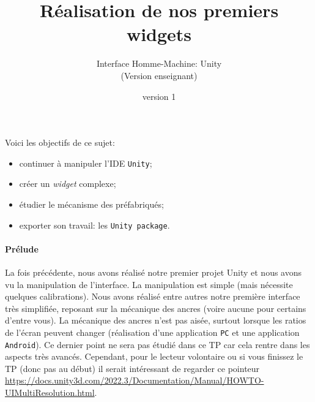 \documentclass[a4paper,10pt]{article}
\newenvironment{attention}%
{\begin{tcolorbox}[breakable,colback=green!25!white,colframe=red!55!black,title=Attention]}%
{\end{tcolorbox}}
\begin{document}
	


\title{\vspace*{-1cm}Réalisation de nos premiers widgets}
\author{\vspace*{-1.5cm}Interface Homme-Machine: Unity
\begin{ensnote}
	(Version enseignant)
\end{ensnote}
}
\date{\vspace*{-1.5cm}version 1}
\maketitle
\thispagestyle{fancy}

Voici les objectifs de ce sujet:
\begin{itemize}
	\item continuer à manipuler l'IDE \texttt{Unity};
	\item créer un \textit{widget} complexe;
	\item étudier le mécanisme des préfabriqués;
	\item exporter son travail: les \texttt{Unity package}.
\end{itemize}


%	

\paragraph{Prélude}
La fois précédente, nous avons réalisé notre premier projet Unity et nous avons vu la manipulation de l'interface. La manipulation est simple (mais nécessite quelques calibrations). Nous avons réalisé entre autres notre première interface très simplifiée, reposant sur la mécanique des ancres (voire aucune pour certains d'entre vous). La mécanique des ancres n'est pas aisée, surtout lorsque les ratios de l'écran peuvent changer (réalisation d'une application \texttt{PC} et une application \texttt{Android}). Ce dernier point ne sera pas étudié dans ce TP car cela rentre dans les aspects très avancés. Cependant, pour le lecteur volontaire ou si vous finissez le TP (donc pas au début) il serait intéressant de regarder ce pointeur \url{https://docs.unity3d.com/2022.3/Documentation/Manual/HOWTO-UIMultiResolution.html}. 
\end{document}
